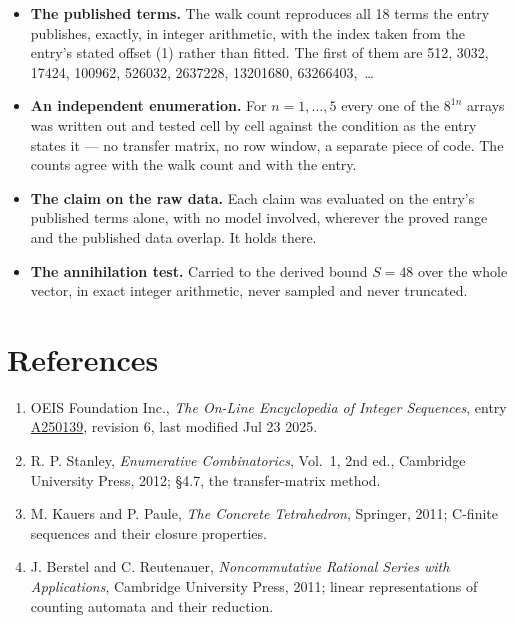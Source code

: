 \documentclass[11pt]{article}
\theoremstyle{definition}
\begin{document}
\begin{itemize}

\item {\bfseries The published terms.} The walk count reproduces all 18 terms the entry publishes, exactly, in integer arithmetic, with the index taken from the entry's stated offset (1) rather than fitted. The first of them are 512, 3032, 17424, 100962, 526032, 2637228, 13201680, 63266403,~\dots

\item {\bfseries An independent enumeration.} For $n = 1,\dots,5$ every one of the $8^{1n}$ arrays was written out and tested cell by cell against the condition as the entry states it --- no transfer matrix, no row window, a separate piece of code. The counts agree with the walk count and with the entry.

\item {\bfseries The claim on the raw data.} Each claim was evaluated on the entry's published terms alone, with no model involved, wherever the proved range and the published data overlap. It holds there.

\item {\bfseries The annihilation test.} Carried to the derived bound $S = 48$ over the whole vector, in exact integer arithmetic, never sampled and never truncated.

\end{itemize}

\section{References}

\begin{enumerate}

\item OEIS Foundation Inc., \emph{The On-Line Encyclopedia of Integer Sequences}, entry \href{https://oeis.org/A250139}{A250139}, revision 6, last modified Jul 23 2025.

\item R. P. Stanley, \emph{Enumerative Combinatorics}, Vol.~1, 2nd ed., Cambridge University Press, 2012; \S4.7, the transfer-matrix method.

\item M. Kauers and P. Paule, \emph{The Concrete Tetrahedron}, Springer, 2011; C-finite sequences and their closure properties.

\item J. Berstel and C. Reutenauer, \emph{Noncommutative Rational Series with Applications}, Cambridge University Press, 2011; linear representations of counting automata and their reduction.

\end{enumerate}
\end{document}
